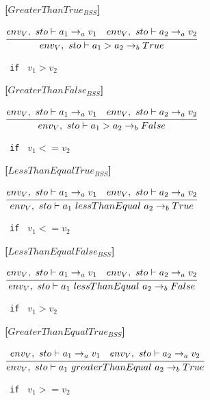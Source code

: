 \textbf{[$GreaterThanTrue_{BSS}$]}\\
\begin{center}
	\begin{math}
	\cfrac
	{env_V,\ sto \vdash a_1 \rightarrow_a v_1 \quad env_V,\ sto \vdash a_2 \rightarrow_a v_2}
	{env_V,\ sto \vdash a_1 > a_2 \rightarrow_b True}
	\end{math}
	
	\texttt{ if } $v_1 > v_2$
\end{center}

\textbf{[$GreaterThanFalse_{BSS}$]}\\
\begin{center}
	\begin{math}
	\cfrac
	{env_V,\ sto \vdash a_1 \rightarrow_a v_1 \quad env_V,\ sto \vdash a_2 \rightarrow_a v_2}
	{env_V,\ sto \vdash a_1 > a_2 \rightarrow_b False}
	\end{math}
	
	\texttt{ if } $v_1 <= v_2$
\end{center}

\textbf{[$LessThanEqualTrue_{BSS}$]}\\
\begin{center}
	\begin{math}
	\cfrac
	{env_V,\ sto \vdash a_1 \rightarrow_a v_1 \quad env_V,\ sto \vdash a_2 \rightarrow_a v_2}
	{env_V,\ sto \vdash a_1\ lessThanEqual\ a_2 \rightarrow_b True}
	\end{math}
	
	\texttt{ if } $v_1 <= v_2$
\end{center}

\textbf{[$LessThanEqualFalse_{BSS}$]}\\
\begin{center}
	\begin{math}
	\cfrac
	{env_V,\ sto \vdash a_1 \rightarrow_a v_1 \quad env_V,\ sto \vdash a_2 \rightarrow_a v_2}
	{env_V,\ sto \vdash a_1\ lessThanEqual\ a_2 \rightarrow_b False}
	\end{math}
	
	\texttt{ if } $v_1 > v_2$
\end{center}

\textbf{[$GreaterThanEqualTrue_{BSS}$]}\\
\begin{center}
	\begin{math}
	\cfrac
	{env_V,\ sto \vdash a_1 \rightarrow_a v_1 \quad env_V,\ sto \vdash a_2 \rightarrow_a v_2}
	{env_V,\ sto \vdash a_1\ greaterThanEqual\ a_2 \rightarrow_b True}
	\end{math}
	
	\texttt{ if } $v_1 >= v_2$
\end{center}


